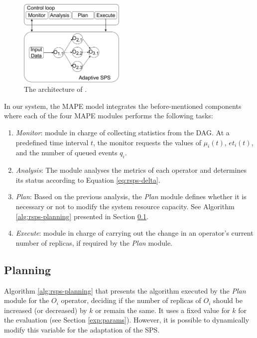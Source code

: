 \begin{figure}[!ht]
    \centering
    \includegraphics[width=0.45\textwidth]{figures/concepts/RA-SPS-Architecture.pdf}
    \caption{The architecture of \rSPS{}.}
    \label{fig:rsps-mape}
\end{figure}

In our system, the MAPE model integrates the before-mentioned components where each of the four MAPE modules performs the following tasks: 
\begin{enumerate} 
    \item \textit{Monitor}: module in charge of collecting statistics from the DAG. At a predefined time interval $t$, the monitor requests the values of $\mu_i(t)$, $et_i(t)$, and the number of queued events $q_i$.
    \item \textit{Analysis}: The module analyses the metrics of each operator and determines its status according to Equation \ref{eq:rsps-delta}.    
    \item \textit{Plan}: Based on the previous analysis, the \textit{Plan} module defines whether it is necessary or not to modify the system resource capacity. See Algorithm \ref{alg:rsps-planning} presented in Section \ref{rsps-planning}.
    \item \textit{Execute}: module in charge of carrying out the change in an operator's current number of replicas, if required by the \textit{Plan} module.
\end{enumerate}

\subsection{Planning}
\label{rsps-planning}

Algorithm \ref{alg:rsps-planning} that presents the algorithm executed by the \textit{Plan} module for the $O_i$ operator, deciding if the number of replicas of $O_i$ should be increased (or decreased) by $k$ or remain the same.
It uses a fixed value for $k$ for the \rSPS{} evaluation (see Section \ref{exp:params}). However, it is possible to dynamically modify this variable for the adaptation of the SPS.

